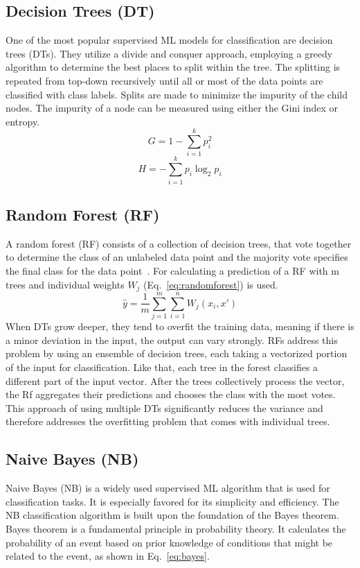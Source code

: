 \subsection{Decision Trees (DT)}
One of the most popular supervised ML models for classification are decision trees (DTs). They utilize a divide and conquer approach, employing a greedy algorithm to determine the best places to split within the tree. The splitting is repeated from top-down recursively until all or most of the data points are classified with class labels. Splits are made to minimize the impurity of the child nodes. The impurity of a node can be measured using either the Gini index or entropy. 
\begin{equation}
    G = 1 - \sum_{i=1}^k p_i^{2}
    \label{eq:gini}
\end{equation}
\begin{equation}
    H = -\sum_{i=1}^k p_i \log_2 p_i
\end{equation}

\subsection{Random Forest (RF)}
A random forest (RF) consists of a collection of decision trees, that vote together to determine the class of an unlabeled data point and the majority vote specifies the final class for the data point~\cite{breiman_random_2001}. For calculating a prediction of a RF with m trees and individual weights $W_j$ (Eq.~\ref{eq:randomforest}) is used. 
\begin{equation}
    \hat{y} = \frac{1}{m}\sum_{j=1}^m \sum_{i=1}^n W_j(x_i,x')
    \label{eq:randomforest}
\end{equation}
When DTs grow deeper, they tend to overfit the training data, meaning if there is a minor deviation in the input, the output can vary strongly. RFs address this problem by using an ensemble of decision trees, each taking a vectorized portion of the input for classification. Like that, each tree in the forest classifies a different part of the input vector. After the trees collectively process the vector, the Rf aggregates their predictions and chooses the class with the most votes. This approach of using multiple DTs significantly reduces the variance and therefore addresses the overfitting problem that comes with individual trees.

\subsection{Naive Bayes (NB)}
Naive Bayes (NB) is a widely used supervised ML algorithm that is used for classification tasks. It is especially favored for its simplicity and efficiency. The NB classification algorithm is built upon the foundation of the Bayes theorem. Bayes theorem is a fundamental principle in probability theory. It calculates the probability of an event based on prior knowledge of conditions that might be related to the event, as shown in Eq.~\ref{eq:bayes}.

